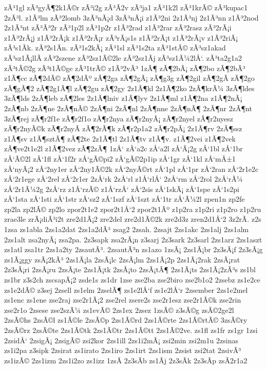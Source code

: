 {zÃ³1gl
zÃ³gyÃ¶2k1Ã©r
zÃ³i2g
zÃ³Ã­2v
zÃ³ja1
zÃ³1k2l
zÃ³1krÃ©
zÃ³kupac1
2zÃ³l.
z1Ã³lm
zÃ³2lomb
3zÃ³nÃ¡d
3zÃ³nÃ¡i
z1Ã³2ni
2z1Ã³nj
2z1Ã³nn
z1Ã³2nod
2z1Ã³nt
zÃ³Ã³2r
zÃ³1p2l
zÃ³1p2r
z1Ã³2rad
z1Ã³2rar
zÃ³2rasz
zÃ³2rÃ¡i
z1Ã³2rÃ¡j
z1Ã³2rÃ¡k
z1Ã³2rÃ¡r
zÃ³rÃ¡s1s
z1Ã³2rÃ¡t
z1Ã³2rÃ¡v
z1Ã³2riÃ¡
zÃ³s1Ã­k.
zÃ³2s1Ã­n.
zÃ³1s2kÃ¡
zÃ³1sl
zÃ³1s2ta
zÃ³1stÃ©
zÃ³sz1akad
zÃ³sz1Ã¡llÃ­
zÃ³2szene
zÃ³2sz1Ã©2le
zÃ³2sz1Ã­j
zÃ³sz1Ã¼2lÅ‘.
zÃ³ta2g1a2
zÃ³tÃ©2g
zÃ³t1Ã©ge
zÃ³1trÃ©
z1Ã³2vÃ³
1zÃ¶
zÃ¶2bÃ¡
zÃ¶2bo
zÃ¶2bÃ³
z1Ã¶cc
zÃ¶2dÃ©
zÃ¶2dÃº
zÃ¶2ga
zÃ¶2gÃ¡
zÃ¶g3g
zÃ¶2gil
zÃ¶2gÃ­
zÃ¶2go
zÃ¶gÃ¶2
zÃ¶2g1Ã¶l
zÃ¶2gu
zÃ¶2gy
2z1Ã¶kl
2z1Ã¶2ko
2zÃ¶krÃ¼
3zÃ¶ldes
3zÃ¶lds
2zÃ¶leb
zÃ¶2les
2z1Ã¶lniv
z1Ã¶lyv
2z1Ã¶ml
z1Ã¶2na
z1Ã¶2nÃ¡
2zÃ¶nb
2zÃ¶ne
2zÃ¶nÃ©
2zÃ¶ni
2zÃ¶nl
2zÃ¶nne
2zÃ¶nÃ¶
2zÃ¶nr
2zÃ¶nt
3zÃ¶rej
zÃ¶r2f1e
zÃ¶r2f1o
zÃ¶r2nya
zÃ¶r2nyÃ¡
zÃ¶r2nyel
zÃ¶r2nyesz
zÃ¶r2nyÃ©k
zÃ¶r2nyÃ­
zÃ¶2rÃ¶k
zÃ¶r2p1a2
zÃ¶r2pÃ¡
2z1Ã¶rv
2zÃ¶ssz
z1Ã¶sv
z1Ã¶sztÃ¶
zÃ¶2te
2z1Ã¶tl
2z1Ã¶tv
z1Ã¶v.
z1Ã¶2vei
z1Ã¶2vek
zÃ¶ve2t1e2l
z1Ã¶2vez
zÃ¶2zÃ¶
1zÅ‘
zÅ‘a2c
zÅ‘a2l
zÅ‘Ã¡2g
zÅ‘1bl
zÅ‘1br
zÅ‘Ã©2l
zÅ‘1fl
zÅ‘1f2r
zÅ‘gÃ©pi2
zÅ‘gÃ©2p1ip
zÅ‘1gr
zÅ‘1kl
zÅ‘mÅ±1
zÅ‘nyÃ¡2
zÅ‘2ny1er
zÅ‘2ny1Ã©2k
zÅ‘2nyÃ©rt
zÅ‘1pl
zÅ‘1pr
zÅ‘2ran
zÅ‘2r1e2c
zÅ‘2r1ege
zÅ‘2rel
zÅ‘2r1er
2zÅ‘rk
2zÅ‘rl
z1Å‘rlÅ‘
2zÅ‘rm
zÅ‘2rol
2zÅ‘rÃ¼
zÅ‘2r1Ã¼2g
2zÅ‘rz
z1Å‘rzÃ©
z1Å‘rzÅ‘
zÅ‘2sis
zÅ‘1skÃ¡
zÅ‘1spe
zÅ‘1s2pi
zÅ‘1sta
zÅ‘1sti
zÅ‘1str
zÅ‘sz2
zÅ‘1szf
zÅ‘1szt
zÅ‘1tr
zÅ‘Ã¼2l
zpen1n
zp2fe
zp2la
zp2lÃ©
zp2lo
zpor2t1e2
zpor2t1Å‘2
zpor2t1Ãº
z1p2ra
z1p2ri
z1p2ro
z1p2ru
zrae3le
zrÃ¡diÃ³i2t
zre2d1Ã¡2
zre2del
zre2d1Ã©2k
zre2d3z
zren2d1Å‘2
3z2rÃ­.
z2s
1zsa
zs1abla
2zs1a2dat
2zs1a2dÃ³
zsag2
2zsah.
2zsajt
2zs1akc
2zs1alj
2zs1alm
2zs1alt
zsa2nyÃ¡
zsa2pa.
2z3sapk
zsa2rÃ¡n
z3sarj
2z3sark
2z3sarl
2zs1arz
2zs1aszt
zs1atl
zsa1tr
2zs1a2ty
2zsautÃ³.
2zsautÃ³n
zs1azo
1zsÃ¡
2zs1Ã¡br
2z3sÃ¡f
2z3sÃ¡g
zs1Ã¡ggy
zsÃ¡2kÃ³
2zs1Ã¡la
2zsÃ¡lc
2zsÃ¡lm
2zs1Ã¡2p
2zs1Ã¡2rak
2zsÃ¡rat
2z3sÃ¡ri
2zsÃ¡ru
2zsÃ¡te
2zs1Ã¡tk
2zsÃ¡to
2zsÃ¡tÃ¶
2zs1Ã¡ts
2zs1Ã¡2zÃ³s
zs1bl
zs1br
z3s2ch
zscsapÃ¡2
zsde1s
zs1dr
1zse
zse2ba
zse2biro
zse2b1o2
2zsebz
zs1e2ce
zs1e2dÃ©
z3sej
2zsell
zs1elm
2zselÃ¶
zs1e2lÅ‘f
zs1e2lÅ‘r
2zsember
2zs1e2mel
zs1enc
zs1ene
zse2raj
zse2r1Ã¡2
zse2rel
zsere2s
zse2r1esz
zse2r1Ã©k
zse2rin
zse2r1o
2zsese
zse2szÃ¼
zs1evÃ©
2zs1ex
2zsez
1zsÃ©
z3sÃ©g
zsÃ©2ge2l
2zsÃ©hs
2zsÃ©l
zs1Ã©le
2zsÃ©p
2zs1Ã©rd
2zs1Ã©rte
2zs1Ã©rtÃ©
3zsÃ©ry
2zsÃ©rz
2zsÃ©te
2zs1Ã©tk
2zs1Ã©tr
2zs1Ã©tt
2zs1Ã©2ve.
zs1fl
zs1fr
zs1gr
1zsi
2zsidÅ‘
2zsigÃ¡
2zsigÃ©
zsi2kor
2zs1ill
2zs1i2mÃ¡
zsi2min
zsi2m1u
2zsinas
zs1i2pa
z3sipk
2zsirat
zs1irato
2zs1iro
2zs1irt
2zs1ism
2zsist
zsi2tat
2zsivÃ³
zs1izÃ©
2zs1izm
2zs1i2zo
zs1izz
1zsÃ­
2z3sÃ­b
zs1Ã­j
2z3sÃ­k
2z3sÃ­p
zsÃ­2r1a2
}
